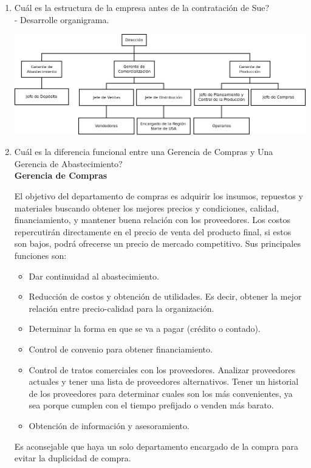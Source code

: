 \documentclass[a4paper,10pt,titlepage]{article}
\begin{document}
\begin{enumerate}
  \item Cu\'al es la estructura de la empresa antes de la contrataci\'on de Sue?\\
  - Desarrolle organigrama.
     \begin{center}
      \includegraphics[angle=90, scale=0.60]{./Organigramas/Emporio1.png}
     \end{center}
\newpage  
  \item Cu\'al es la diferencia funcional entre una Gerencia de Compras y Una Gerencia de Abastecimiento?\\

\textbf{Gerencia de Compras}

	\indent El objetivo del departamento de compras es adquirir los insumos, repuestos y materiales buscando obtener los mejores precios y condiciones, calidad, financiamiento, y mantener buena relaci\'on con los proveedores. Los costos repercutir\'an directamente en el precio de venta del producto final, si estos son bajos, podr\'a ofrecerse un precio de mercado competitivo. Sus principales funciones son: 
		\begin{itemize}
		\item Dar continuidad al abastecimiento.
		\item Reducci\'on de costos y obtenci\'on de utilidades. Es decir, obtener la mejor relación entre precio-calidad para la organización.
		\item Determinar la forma en que se va a pagar (crédito o contado).
		\item Control de convenio para obtener financiamiento.
		\item Control de tratos comerciales con los proveedores. Analizar proveedores actuales y tener una lista de proveedores alternativos. Tener un historial de los proveedores para determinar cuales son los más convenientes, ya sea porque cumplen con el tiempo prefijado o venden más barato.
		\item Obtenci\'on de informaci\'on y asesoramiento.
		\end{itemize}
	\indent Es aconsejable que haya un solo departamento encargado de la compra para evitar la duplicidad de compra.\\\\


\end{enumerate}
\end{document}
